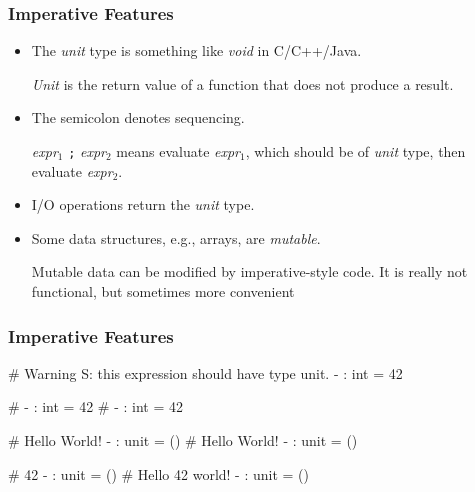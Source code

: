 \documentclass{plt}
\begin{document}
\begin{frame}[fragile]
  \frametitle{Imperative Features}

\begin{itemize}

\item The \emph{unit} type is something like \emph{void} in C/C++/Java.

\emph{Unit} is the return value of a function that does not produce a result.

\item The semicolon denotes sequencing.

\emph{expr}$_1$ \texttt{;}
  \emph{expr}$_2$ means evaluate \emph{expr}$_1$, which should be of
  \emph{unit} type, then evaluate \emph{expr}$_2$.

\item I/O operations return the \emph{unit} type.

\item Some data structures, e.g., arrays, are \emph{mutable}.

Mutable data can be modified by imperative-style code.  It is really
not functional, but sometimes more convenient
\end{itemize}

\end{frame}

\fi

\begin{frame}[fragile]
  \frametitle{Imperative Features}

\begin{interactive}
# 
Warning S: this expression should have type unit.
- : int = 42

# 
- : int = 42
# 
- : int = 42

# 
Hello World!
- : unit = ()
# 
Hello World!
- : unit = ()

# 
42
- : unit = ()
# 
Hello 42 world!
- : unit = ()
\end{interactive}

\end{frame}
\end{document}
